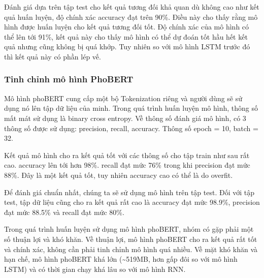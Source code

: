 Đánh giá dựa trên tập test cho kết quả tương đối khả quan dù không cao như kết quả huấn luyện, độ chính xác accuracy đạt trên 90\%. Điều này cho thấy rằng mô hình được huấn luyện cho kết quả tương đối tốt. Độ chính xác của mô hình có thể lên tới 91\%, kết quả này cho thấy mô hình có thể dự đoán tốt hầu hết kết quả nhưng cũng không bị quá khớp. Tuy nhiên so với mô hình LSTM trước đó thì kết quả này có phần lép vế.

\subsubsection{Tinh chỉnh mô hình PhoBERT}
Mô hình phoBERT cung cấp một bộ Tokenization riêng và người dùng sẽ sử dụng nó lên tập dữ liệu của minh. Trong quá trình huấn luyện mô hình, thông số mất mát sử dụng là binary cross entropy. Về thông số đánh giá mô hình, có 3 thông số được sử dụng: precision, recall, accuracy. Thông số epoch = 10, batch = 32.

Kết quả mô hình cho ra kết quả tốt với các thông số cho tập train như sau rất cao. accuracy lên tới hơn 98\%. recall đạt mức 76\% trong khi precision đạt mức 88\%. Đây là một kết quả tốt, tuy nhiên accuracy cao có thể là do overfit.

Để đánh giá chuẩn nhất, chúng ta sẽ sử dụng mô hình trên tập test. Đối với tập test, tập dữ liệu cũng cho ra kết quả rất cao là accuracy đạt mức 98.9\%, precision đạt mức 88.5\% và recall đạt mức 80\%.

Trong quá trình huấn luyện sử dụng mô hình phoBERT, nhóm có gặp phải một số thuận lợi và khó khăn. Về thuận lợi, mô hình phoBERT cho ra kết quả rất tốt và chính xác, không cần phải tinh chỉnh mô hình quá nhiều. Về mặt khó khăn và hạn chế, mô hình phoBERT khá lớn (\textasciitilde 519MB, hơn gấp đôi so với mô hình LSTM) và có thời gian chạy khá lâu so với mô hình RNN.

